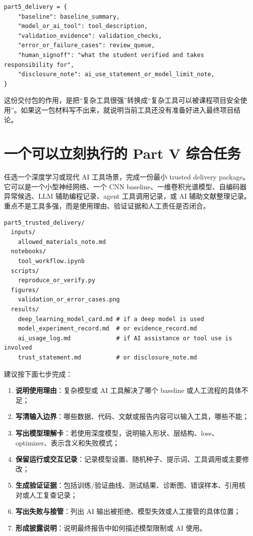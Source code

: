 \begin{examplebox}
\begin{lstlisting}[style=pythonstyle]
part5_delivery = {
    "baseline": baseline_summary,
    "model_or_ai_tool": tool_description,
    "validation_evidence": validation_checks,
    "error_or_failure_cases": review_queue,
    "human_signoff": "what the student verified and takes responsibility for",
    "disclosure_note": ai_use_statement_or_model_limit_note,
}
\end{lstlisting}
\end{examplebox}

这份交付包的作用，是把“复杂工具很强”转换成“复杂工具可以被课程项目安全使用”。如果这一包材料写不出来，就说明当前工具还没有准备好进入最终项目结论。

\section*{一个可以立刻执行的 Part V 综合任务}

任选一个深度学习或现代 AI 工具场景，完成一份最小 trusted delivery package。它可以是一个小型神经网络、一个 CNN baseline、一维卷积光谱模型、自编码器异常候选、LLM 辅助编程记录、agent 工具调用记录，或 AI 辅助文献整理记录。重点不是工具多强，而是使用理由、验证证据和人工责任是否闭合。

\begin{examplebox}
\begin{lstlisting}[style=terminal]
part5_trusted_delivery/
  inputs/
    allowed_materials_note.md
  notebooks/
    tool_workflow.ipynb
  scripts/
    reproduce_or_verify.py
  figures/
    validation_or_error_cases.png
  results/
    deep_learning_model_card.md # if a deep model is used
    model_experiment_record.md  # or evidence_record.md
    ai_usage_log.md             # if AI assistance or tool use is involved
    trust_statement.md          # or disclosure_note.md
\end{lstlisting}
\end{examplebox}

建议按下面七步完成：

\begin{enumerate}
    \item \textbf{说明使用理由}：复杂模型或 AI 工具解决了哪个 baseline 或人工流程的具体不足；
    \item \textbf{写清输入边界}：哪些数据、代码、文献或报告内容可以输入工具，哪些不能；
    \item \textbf{写出模型理解卡}：若使用深度模型，说明输入形状、层结构、loss、optimizer、表示含义和失败模式；
    \item \textbf{保留运行或交互记录}：记录模型设置、随机种子、提示词、工具调用或主要修改；
    \item \textbf{生成验证证据}：包括训练/验证曲线、测试结果、诊断图、错误样本、引用核对或人工复查记录；
    \item \textbf{写出失败与接管}：列出 AI 输出被拒绝、模型失效或人工接管的具体位置；
    \item \textbf{形成披露说明}：说明最终报告中如何描述模型限制或 AI 使用。
\end{enumerate}


